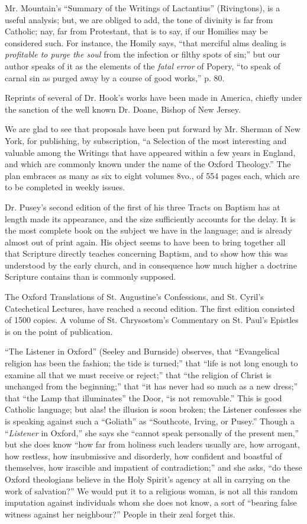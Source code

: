 Mr. Mountain's ``Summary of the Writings of
Lactantius'' (Rivingtons), is a useful analysis; but, we are obliged to
add, the tone of divinity is far from Catholic; nay, far from
Protestant, that is to say, if our Homilies may be considered such. For
instance, the Homily says, ``that merciful alms dealing is \emph{profitable
to purge the soul} from the infection or filthy spots of sin;'' but
our author speaks of it as the elements of the \emph{fatal error} of
Popery, ``to speak of carnal sin as purged away by a course of good
works,'' p. 80.

Reprints of several of Dr. Hook's works have been
made in America, chiefly under the sanction of the well known Dr. Doane,
Bishop of New Jersey.

We are glad to see that proposals have been put
forward by Mr. Sherman of New York, for publishing, by subscription, ``a
Selection of the most interesting and valuable among the Writings
that have appeared within a few years in England, and which are commonly
known under the name of the Oxford Theology.'' The plan embraces as many
as six to eight volumes 8vo., of 554 pages each, which are to be
completed in weekly issues.

Dr. Pusey's second edition of the first of his
three Tracts on Baptism has at length made its appearance, and the size
sufficiently accounts for the delay. It is the most complete book on the
subject we have in the language; and is already almost out of print
again. His object seems to have been to bring together all that
Scripture directly teaches concerning Baptism, and to show how this was
understood by the early church, and in consequence how much higher a
doctrine Scripture contains than is commonly supposed.

The Oxford Translations of St. Augustine's
Confessions, and St. Cyril's Catechetical Lectures, have reached a
second edition. The first edition consisted of 1500 copies. A volume of
St. Chrysostom's Commentary on St. Paul's Epistles is on the point of
publication.

``The Listener in Oxford'' (Seeley and Burnside)
observes, that ``Evangelical religion has been the fashion; the tide is
turned;'' that ``life is not long enough to examine all that we must
receive or reject;'' that ``the religion of Christ is unchanged from the
beginning;'' that ``it has never had so much as a new dress;'' that ``the
Lamp that illuminates'' the Door, ``is not removable.'' This is good
Catholic language; but alas! the illusion is soon broken; the Listener
confesses she is speaking against such a ``Goliath'' as ``Southcote,
Irving, or Pusey.'' Though a ``\emph{Listener} in Oxford,'' she says she ``cannot
speak personally of the present men,'' but she does know ``how far from
holiness such leaders usually are, how arrogant, how restless, how
insubmissive and disorderly, how confident and boastful of themselves,
how irascible and impatient of contradiction;'' and she asks, ``do these
Oxford theologians believe in the Holy Spirit's agency at all in
carrying on the work of salvation?'' We would put it to a religious
woman, is not all this random imputation against individuals whom she
does not know, a sort of ``bearing false witness against her neighbour?''
People in their zeal forget this.

